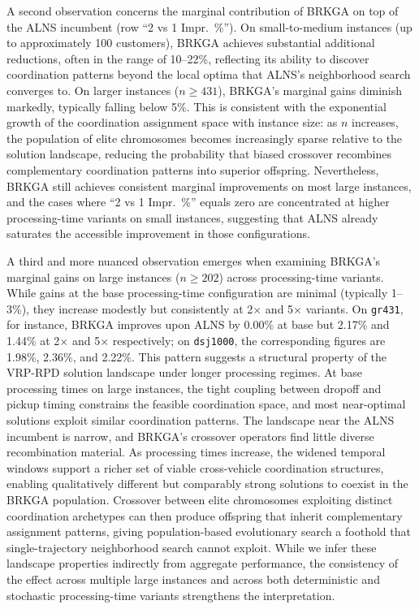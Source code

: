 \documentclass{article}
\begin{document}
A second observation concerns the marginal contribution of BRKGA on top of the ALNS incumbent (row ``2 vs 1 Impr.~\%''). On small-to-medium instances (up to approximately 100 customers), BRKGA achieves substantial additional 
reductions, often in the range of 10--22\%, reflecting its ability to discover coordination patterns beyond the local optima that ALNS's neighborhood search converges to. On larger instances ($n \geq 431$), BRKGA's marginal gains diminish markedly, typically falling below 5\%. This is consistent with the exponential growth of the coordination assignment space with instance size: as $n$ increases, the population of elite chromosomes becomes increasingly sparse relative to the solution landscape, reducing the probability that biased crossover recombines complementary coordination patterns into superior offspring. Nevertheless, BRKGA still achieves consistent marginal improvements on most large instances, and the cases where ``2 vs 1 Impr.~\%'' equals zero are concentrated at higher processing-time variants on small instances, suggesting that ALNS already saturates the accessible improvement in those configurations.

A third and more nuanced observation emerges when examining BRKGA's marginal gains on large instances ($n \geq 202$) across processing-time variants. While gains at the base processing-time configuration are minimal (typically 1--3\%), they increase modestly but consistently at 2$\times$ and 5$\times$ 
variants. On \texttt{gr431}, for instance, BRKGA improves upon ALNS by 0.00\% at base but 2.17\% and 1.44\% at 2$\times$ and 5$\times$ respectively; on \texttt{dsj1000}, the corresponding figures are 1.98\%, 2.36\%, and 2.22\%. This pattern suggests a structural property of the VRP-RPD solution landscape under longer processing regimes. At base processing times on large instances, the tight coupling between dropoff and pickup timing constrains the feasible coordination space, and most near-optimal solutions exploit similar coordination patterns. The landscape near the ALNS incumbent is narrow, and BRKGA's crossover operators find little diverse recombination material. As processing times increase, the widened temporal windows support a richer set of viable cross-vehicle coordination structures, enabling qualitatively different but comparably 
strong solutions to coexist in the BRKGA population. Crossover between elite chromosomes exploiting distinct coordination archetypes can then produce offspring that inherit complementary assignment patterns, giving population-based evolutionary search a foothold that single-trajectory neighborhood search cannot exploit. While we infer these landscape properties indirectly from aggregate performance, the consistency of the effect across multiple large instances and across both deterministic and stochastic processing-time variants strengthens the interpretation.
\end{document}
